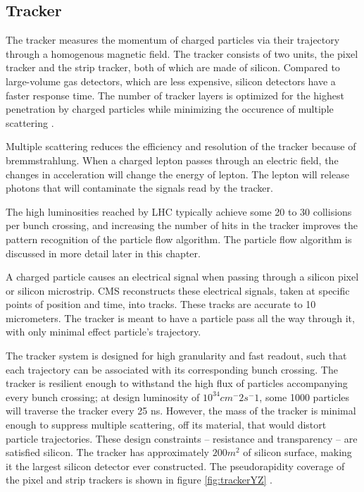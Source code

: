 \subsection{Tracker}

The tracker measures the momentum of charged particles via their trajectory through a homogenous magnetic field. The tracker consists of two units, the pixel tracker and the strip tracker, both of which are made of silicon. Compared to large-volume gas detectors, which are less expensive, silicon detectors have a faster response time. The number of tracker layers is optimized for the highest penetration by charged particles while minimizing the occurence of multiple scattering \cite{cmsTdrTrk}. 

Multiple scattering reduces the efficiency and resolution of the tracker because of bremmstrahlung. When a charged lepton passes through an electric field, the changes in acceleration will change the energy of lepton. The lepton will release photons that will contaminate the signals read by the tracker. 

The high luminosities reached by LHC typically achieve some 20 to 30 collisions per bunch crossing, and increasing the number of hits in the tracker improves the pattern recognition of the particle flow algorithm. The particle flow algorithm is discussed in more detail later in this chapter. 

A charged particle causes an electrical signal when passing through a silicon pixel or silicon microstrip. CMS reconstructs these electrical signals, taken at specific points of position and time, into tracks. These tracks are accurate to 10 micrometers. The tracker is meant to have  a particle pass all the way through it, with only minimal effect particle's trajectory. 

The tracker system is designed for high granularity and fast readout, such that each trajectory can be associated with its corresponding bunch crossing. The tracker is resilient enough to withstand the high flux of particles accompanying every bunch crossing; at design luminosity of $10^34 cm^-2 s^-1$, some 1000 particles will traverse the tracker every 25 ns. However, the mass of the tracker is minimal enough to suppress multiple scattering, off its material, that would distort particle trajectories. These design constraints -- resistance and transparency -- are satisfied silicon. The tracker has approximately $200 m^2$ of silicon surface, making it the largest silicon detector ever constructed. The pseudorapidity coverage of the pixel and strip trackers is shown in figure \ref{fig:trackerYZ} \cite{Chatrchyan:2009sr}.

